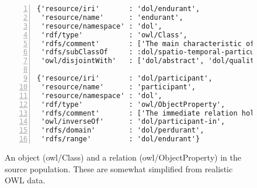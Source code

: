 \documentclass[9pt,letterpaper]{article}
\begin{document}
\begin{figure}[H]
  \caption{An object (owl/Class) and a relation (owl/ObjectProperty) in the source population.
    These are somewhat simplified from realistic OWL data.}
  \label{code:endurant}
\begin{lstlisting}[numberstyle=\scriptsize,basicstyle=\ttfamily\scriptsize,numbers=left,stepnumber=1,breaklines=true]
{'resource/iri'       : 'dol/endurant',
 'resource/name'      : 'endurant',
 'resource/namespace' : 'dol',
 'rdf/type'           : 'owl/Class',
 'rdfs/comment'       : ['The main characteristic of endurants is...'],
 'rdfs/subClassOf     : :dol/spatio-temporal-particular,
 'owl/disjointWith'   : ['dol/abstract', 'dol/quality', 'dol/perdurant']}

{'resource/iri'       : 'dol/participant',
 'resource/name'      : 'participant',
 'resource/namespace' : 'dol',
 'rdf/type'           : 'owl/ObjectProperty',
 'rdfs/comment'       : ['The immediate relation holding between endurants and perdurants...'],
 'owl/inverseOf'      : 'dol/participant-in',
 'rdfs/domain'        : 'dol/perdurant',
 'rdfs/range'         : 'dol/endurant'}
\end{lstlisting}
\end{figure}
\end{document}
